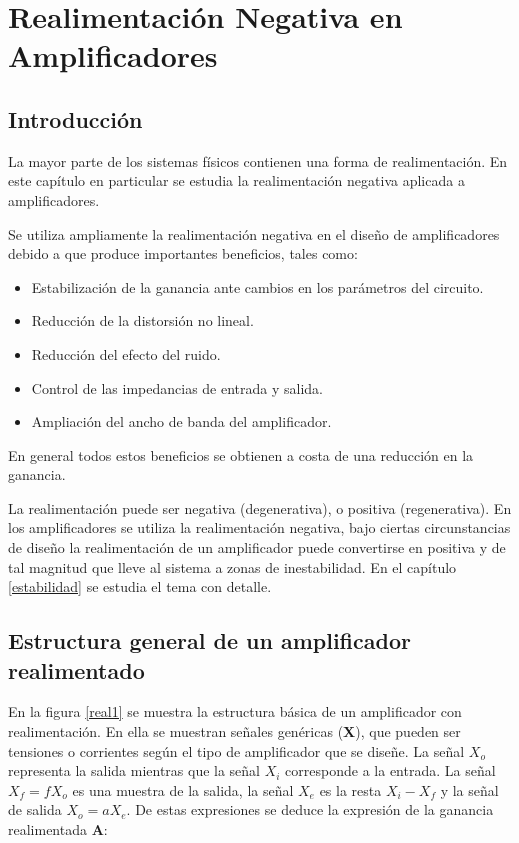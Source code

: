 \chapter{Realimentación Negativa en Amplificadores}\label{realimentacion}




\section{Introducción}

\hspace{10pt} La mayor parte de los sistemas físicos contienen una forma de
realimentación. En este capítulo en particular se estudia la
realimentación negativa aplicada a amplificadores.

Se utiliza ampliamente la realimentación negativa en el diseño de
amplificadores debido a que produce importantes beneficios, tales
como:

\begin{itemize}
	\item Estabilización de la ganancia ante cambios en los
	parámetros del circuito.
	\item Reducción de la distorsión no lineal.
	\item Reducción del efecto del ruido.
	\item Control de las impedancias de entrada y salida.
	\item Ampliación del ancho de banda del amplificador.
\end{itemize}

En general todos estos beneficios se obtienen a costa de una
reducción en la ganancia.

La realimentación puede ser negativa (degenerativa), o positiva
(regenerativa). En los amplificadores se utiliza la realimentación
negativa, bajo ciertas circunstancias de diseño la realimentación de
un amplificador puede convertirse en positiva y de tal magnitud que
lleve al sistema a zonas de inestabilidad. En el capítulo \ref{estabilidad} se estudia el tema con detalle.

\section{Estructura general de un amplificador realimentado}

\hspace{10pt}  En la figura \ref{real1} se muestra la estructura básica de un
amplificador con realimentación. En ella se muestran señales
genéricas (\textbf{X}), que pueden ser tensiones o corrientes según
el tipo de amplificador que se diseñe. La señal $X_o$ representa la
salida mientras que la señal $X_i$ corresponde a la entrada. La
señal $X_f=f X_o$ es una muestra de la salida, la señal $X_e$ es la
resta $X_i-X_f$ y la señal de salida $X_o=a X_e$. De estas
expresiones se deduce la expresión de la ganancia realimentada
\textbf{A}:




